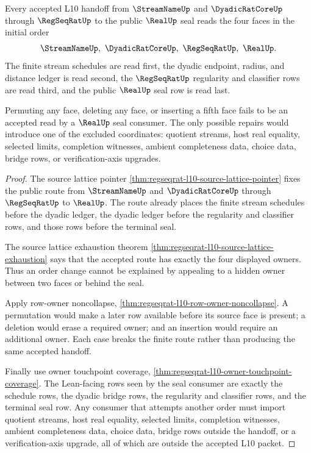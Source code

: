 \begin{theorem}
\label{thm:regseqrat-l10-face-order-initiality}
Every accepted L10 handoff from $\StreamNameUp$ and $\DyadicRatCoreUp$ through
$\RegSeqRatUp$ to the public $\RealUp$ seal reads the four faces in the initial
order
$$
\StreamNameUp,\ \DyadicRatCoreUp,\ \RegSeqRatUp,\ \RealUp .
$$
The finite stream schedules are read first, the dyadic endpoint, radius, and
distance ledger is read second, the $\RegSeqRatUp$ regularity and classifier
rows are read third, and the public $\RealUp$ seal row is read last.

Permuting any face, deleting any face, or inserting a fifth face fails to be an
accepted read by a $\RealUp$ seal consumer. The only possible repairs would
introduce one of the excluded coordinates: quotient streams, host real equality,
selected limits, completion witnesses, ambient completeness data, choice data,
bridge rows, or verification-axis upgrades.
\end{theorem}
\begin{proof}
The source lattice pointer
\autoref{thm:regseqrat-l10-source-lattice-pointer} fixes the public route from
$\StreamNameUp$ and $\DyadicRatCoreUp$ through $\RegSeqRatUp$ to $\RealUp$.
The route already places the finite stream schedules before the dyadic ledger,
the dyadic ledger before the regularity and classifier rows, and those rows
before the terminal seal.

The source lattice exhaustion theorem
\autoref{thm:regseqrat-l10-source-lattice-exhaustion} says that the accepted
route has exactly the four displayed owners. Thus an order change cannot be
explained by appealing to a hidden owner between two faces or behind the seal.

Apply row-owner noncollapse,
\autoref{thm:regseqrat-l10-row-owner-noncollapse}. A permutation would make a
later row available before its source face is present; a deletion would erase a
required owner; and an insertion would require an additional owner. Each case
breaks the finite route rather than producing the same accepted handoff.

Finally use owner touchpoint coverage,
\autoref{thm:regseqrat-l10-owner-touchpoint-coverage}. The Lean-facing rows
seen by the seal consumer are exactly the schedule rows, the dyadic bridge
rows, the regularity and classifier rows, and the terminal seal row. Any
consumer that attempts another order must import quotient streams, host real
equality, selected limits, completion witnesses, ambient completeness data,
choice data, bridge rows outside the handoff, or a verification-axis upgrade,
all of which are outside the accepted L10 packet.
\end{proof}
